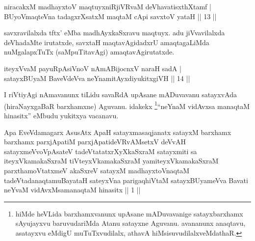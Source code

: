\begin{shl}
niracakxM madhayxtoV maqtuyxniRjiVRvaM deVhavatisxthXtamf | \\
BUyoV\s maqteVna tadagxrXsatxM maqtaM cApi savxtoV yataH \hfill ||  13 || 
\end{shl}

\begin{artha}
savxravilalxda tftx' eMba madhAyxkaSxravu maqtuyx. adu jiVvavilalxda deVhadaMte irutatxde, savxtaH maqtavAgidadxrU amaqtagaLiMda nuMgalapxTuTx (saMpuTitavAgi) amaqtavAgirutatxde.
\end{artha}

\begin{shl}
iteyxVvaM payuRpAsiVnoV nAmABijocnxV naraH sadA | \\
satayxBUyaM BaveVdeVva neYnamitAyxdiyukitxgiVH \hfill ||  14 || 
\end{shl}

\begin{artha}
I riVtiyAgi nAmavanunx tiLidu savaRdA upAsane mADuvavanu satayxvAda (hiraNayxgaBaR barxhamxne) Aguvanu. idakekx \footnote{hiMde heVLida barxhamxvanunx upAsane mADuvavanige satayxbarxhamx sAyujayxvu baruvudariMda Atanu satayxne Aguvanu. avananunx anaqtavu, asatayxvu eMdigU muTuTxvudilalx, athavA hiMsisuvudilalxveMdathaR.}``neYnaM vidAvxsa manaqtaM hinasitx'' eMbudu yukitxya vacanavu.
\end{artha}





\begin{kandikeshl}
Apa EveVdamagarx AsusAtx ApaH satayxmasaqjanatx satayxM barxhamx barxhamx parxjApatiM parxjApatideVRvAMsetxV deVvAH satayxmeVvoVpAsateV tadeVtatatxrXyXkaSxraM satayxmiti sa iteyxVkamakaSxraM tiVteyxVkamakaSxraM yamiteyxVkamakaSxraM parxthamoVtatxmeV akaSxreV satayxM madhayxtoV\s naqtaM tadeVtadanaqtamuBayataH sateyxVna parigaqhiVtaM satayxBUyameVva Bavati neYvaM vidAvxMsamanaqtaM hinasitx || 1 ||
\end{kandikeshl}

